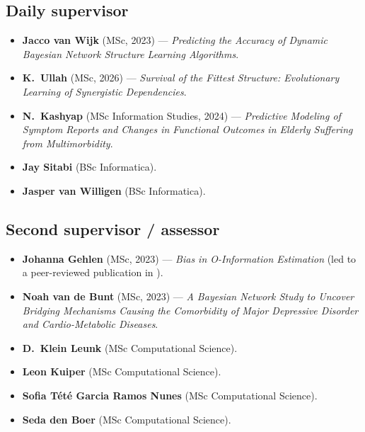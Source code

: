 \documentclass[10pt]{article}
\begin{document}
\subsection{Daily supervisor}
\begin{itemize}
  \item \textbf{Jacco van Wijk} (MSc, 2023) --- \emph{Predicting the Accuracy of Dynamic Bayesian Network Structure Learning Algorithms}.
  \item \textbf{K.\ Ullah} (MSc, 2026) --- \emph{Survival of the Fittest Structure: Evolutionary Learning of Synergistic Dependencies}.
  \item \textbf{N.\ Kashyap} (MSc Information Studies, 2024) --- \emph{Predictive Modeling of Symptom Reports and Changes in Functional Outcomes in Elderly Suffering from Multimorbidity}.
  \item \textbf{Jay Sitabi} (BSc Informatica).
  \item \textbf{Jasper van Willigen} (BSc Informatica).
\end{itemize}
\subsection{Second supervisor / assessor}
\begin{itemize}
  \item \textbf{Johanna Gehlen} (MSc, 2023) --- \emph{Bias in O-Information Estimation} (led to a peer-reviewed publication in ).
  \item \textbf{Noah van de Bunt} (MSc, 2023) --- \emph{A Bayesian Network Study to Uncover Bridging Mechanisms Causing the Comorbidity of Major Depressive Disorder and Cardio-Metabolic Diseases}.
  \item \textbf{D.\ Klein Leunk} (MSc Computational Science).
  \item \textbf{Leon Kuiper} (MSc Computational Science).
  \item \textbf{Sofia T\'et\'e Garcia Ramos Nunes} (MSc Computational Science).
  \item \textbf{Seda den Boer} (MSc Computational Science).
\end{itemize}
\end{document}
